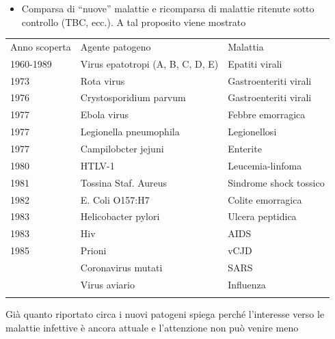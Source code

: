 \begin{itemize}
\item
  Comparsa di ``nuove'' malattie e ricomparsa di malattie ritenute sotto
  controllo (TBC, ecc.). A tal proposito viene mostrato
\end{itemize}

\begin{table}
\begin{tabular}{p{}p{}p{}}
\hline\noalign{\smallskip}
Anno scoperta & Agente patogeno & Malattia \\
\noalign{\smallskip}\svhline\noalign{\smallskip}
1960-1989	& Virus epatotropi (A, B, C, D, E) &	Epatiti virali \\
1973	 & Rota virus &	Gastroenteriti virali \\
1976	 & Crystosporidium parvum &	Gastroenteriti virali \\
1977	 & Ebola virus	& Febbre emorragica \\
1977 & 	Legionella pneumophila &	Legionellosi \\
1977	 & Campilobcter jejuni &	Enterite \\
1980	 & HTLV-1	& Leucemia-linfoma \\
1981 & 	Tossina Staf. Aureus	 & Sindrome shock tossico \\
1982	 & E. Coli O157:H7 & 	Colite emorragica \\
1983	 & Helicobacter pylori	& Ulcera peptidica  \\
1983 & 	Hiv	& AIDS \\
1985	 & Prioni	& vCJD \\
 & Coronavirus mutati &	SARS \\
 & Virus aviario	 & Influenza  \\
\noalign{\smallskip}\hline\noalign{\smallskip}
\end{tabular}
\end{table}

Già quanto riportato circa i nuovi patogeni spiega perché l'interesse
verso le malattie infettive è ancora attuale e l'attenzione non può
venire meno

